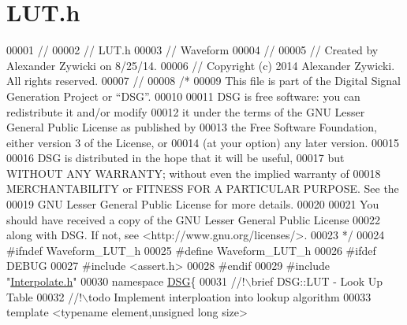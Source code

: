 \hypertarget{_l_u_t_8h_source}{\section{L\+U\+T.\+h}
\label{_l_u_t_8h_source}
}

\begin{DoxyCode}
00001 \textcolor{comment}{//}
00002 \textcolor{comment}{//  LUT.h}
00003 \textcolor{comment}{//  Waveform}
00004 \textcolor{comment}{//}
00005 \textcolor{comment}{//  Created by Alexander Zywicki on 8/25/14.}
00006 \textcolor{comment}{//  Copyright (c) 2014 Alexander Zywicki. All rights reserved.}
00007 \textcolor{comment}{//}
00008 \textcolor{comment}{/*}
00009 \textcolor{comment}{ This file is part of the Digital Signal Generation Project or “DSG”.}
00010 \textcolor{comment}{}
00011 \textcolor{comment}{ DSG is free software: you can redistribute it and/or modify}
00012 \textcolor{comment}{ it under the terms of the GNU Lesser General Public License as published by}
00013 \textcolor{comment}{ the Free Software Foundation, either version 3 of the License, or}
00014 \textcolor{comment}{ (at your option) any later version.}
00015 \textcolor{comment}{}
00016 \textcolor{comment}{ DSG is distributed in the hope that it will be useful,}
00017 \textcolor{comment}{ but WITHOUT ANY WARRANTY; without even the implied warranty of}
00018 \textcolor{comment}{ MERCHANTABILITY or FITNESS FOR A PARTICULAR PURPOSE.  See the}
00019 \textcolor{comment}{ GNU Lesser General Public License for more details.}
00020 \textcolor{comment}{}
00021 \textcolor{comment}{ You should have received a copy of the GNU Lesser General Public License}
00022 \textcolor{comment}{ along with DSG.  If not, see <http://www.gnu.org/licenses/>.}
00023 \textcolor{comment}{ */}
00024 \textcolor{preprocessor}{#ifndef Waveform\_LUT\_h}
00025 \textcolor{preprocessor}{#define Waveform\_LUT\_h}
00026 \textcolor{preprocessor}{#ifdef DEBUG}
00027 \textcolor{preprocessor}{#include <assert.h>}
00028 \textcolor{preprocessor}{#endif}
00029 \textcolor{preprocessor}{#include "\hyperlink{_interpolate_8h}{Interpolate.h}"}
00030 \textcolor{keyword}{namespace }\hyperlink{namespace_d_s_g}{DSG}\{\textcolor{comment}{}
00031 \textcolor{comment}{    //!\(\backslash\)brief DSG::LUT - Look Up Table}
00032 \textcolor{comment}{    //!\(\backslash\)todo Implement interploation into lookup algorithm}
00033 \textcolor{comment}{}    \textcolor{keyword}{template} <\textcolor{keyword}{typename} element,\textcolor{keywordtype}{unsigned} \textcolor{keywordtype}{long} size>

\end{DoxyCode}

